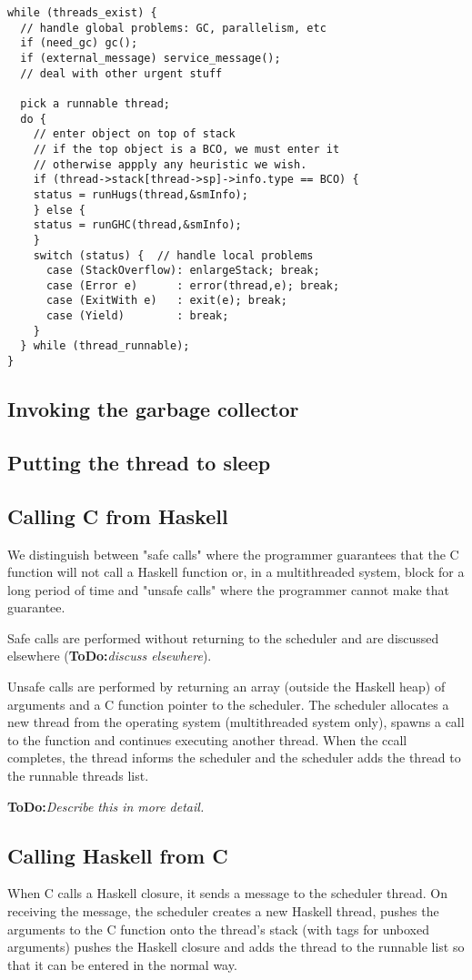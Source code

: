 \documentclass[11pt]{article}
\newcommand{\ToDo}[1]{{{\bf ToDo:}\sl #1}}
\newcommand{\Subsection}[2]{\subsection{#1}\label{sec:#2}}
\begin{document}
\begin{verbatim}
while (threads_exist) {
  // handle global problems: GC, parallelism, etc
  if (need_gc) gc();  
  if (external_message) service_message();
  // deal with other urgent stuff

  pick a runnable thread;
  do {
    // enter object on top of stack
    // if the top object is a BCO, we must enter it
    // otherwise appply any heuristic we wish.
    if (thread->stack[thread->sp]->info.type == BCO) {
	status = runHugs(thread,&smInfo);
    } else {
	status = runGHC(thread,&smInfo);
    }
    switch (status) {  // handle local problems
      case (StackOverflow): enlargeStack; break;
      case (Error e)      : error(thread,e); break;
      case (ExitWith e)   : exit(e); break;
      case (Yield)        : break;
    }
  } while (thread_runnable);
}
\end{verbatim}

\Subsection{Invoking the garbage collector}{ghc-invoking-gc}

\Subsection{Putting the thread to sleep}{ghc-thread-sleeps}

\Subsection{Calling C from Haskell}{ghc-ccall}

We distinguish between "safe calls" where the programmer guarantees
that the C function will not call a Haskell function or, in a
multithreaded system, block for a long period of time and "unsafe
calls" where the programmer cannot make that guarantee.  

Safe calls are performed without returning to the scheduler and are
discussed elsewhere (\ToDo{discuss elsewhere}).

Unsafe calls are performed by returning an array (outside the Haskell
heap) of arguments and a C function pointer to the scheduler.  The
scheduler allocates a new thread from the operating system
(multithreaded system only), spawns a call to the function and
continues executing another thread.  When the ccall completes, the
thread informs the scheduler and the scheduler adds the thread to the
runnable threads list.  

\ToDo{Describe this in more detail.}


\Subsection{Calling Haskell from C}{ghc-c-calls-haskell}

When C calls a Haskell closure, it sends a message to the scheduler
thread.  On receiving the message, the scheduler creates a new Haskell
thread, pushes the arguments to the C function onto the thread's stack
(with tags for unboxed arguments) pushes the Haskell closure and adds
the thread to the runnable list so that it can be entered in the
normal way.
\end{document}
